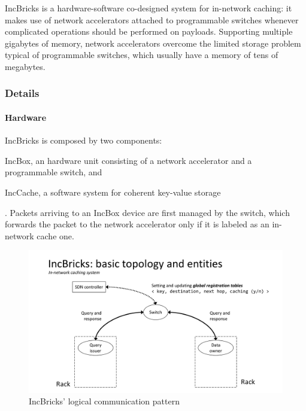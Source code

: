 IncBricks \cite{incbricks} is a hardware-software co-designed system for in-network caching: it makes use of network accelerators attached to programmable switches whenever complicated operations should be performed on payloads.
Supporting multiple gigabytes of memory, network accelerators overcome the limited storage problem typical of programmable switches, which usually have a memory of tens of megabytes.

\subsubsection{Details}
\paragraph{Hardware}
IncBricks \cite{incbricks} is composed by two components:
\begin{mylist}
    \item IncBox, an hardware unit consisting of a network accelerator and a programmable switch, and
    \item IncCache, a software system for coherent key-value storage
\end{mylist}.
Packets arriving to an IncBox device are first managed by the switch, which forwards the packet to the network accelerator only if it is labeled as an in-network cache one.

\begin{figure}[!htb]
    \centering
        \includegraphics[page=3, clip, trim=3.6cm 0.7cm 2.5cm 4.15cm, width=1.00\textwidth]{figures/analysis/inp/presentation.pdf}
    \caption{IncBricks' \texorpdfstring{\cite{incbricks}}{} logical communication pattern}
\end{figure}


